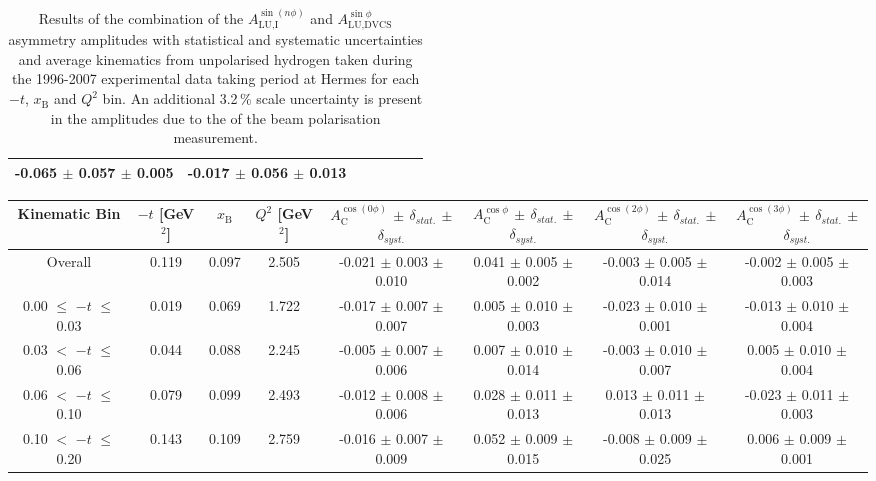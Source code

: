 \begin{table}[width=15cm]
\begin{center}
{\begin{tabular}{|c|c|c|c|c|c|c|}
-0.065  $\pm$  0.057 $\pm$ 0.005 & -0.017  $\pm$  0.056  $\pm$  0.013\\
\hline
  \end{tabular}
}
 \end{center}
\caption{Results of the combination of the $A_{\textrm{LU,I}}^{\sin(n\phi)}$ and $A_{\textrm{LU,DVCS}}^{\sin \phi}$ asymmetry amplitudes with statistical and systematic uncertainties and average kinematics from unpolarised hydrogen taken during
the 1996-2007 experimental data taking period at H{\sc ermes} for each $-t$, $x_{\textrm{B}}$ and $Q^{2}$ bin.
An additional 3.2\,\% scale uncertainty is present in the amplitudes due to the  of
the beam polarisation measurement.
}
\end{table}


\begin{table}[width=15cm]
 \begin{center}
\resizebox{16cm}{!} {
  \begin{tabular}{|c|c|c|c|c|c|c|c|}
\hline
Kinematic Bin &  $-t$ [GeV$^{2}$] & $x_{\textrm{B}}$ & $Q^{2}$ [GeV$^{2}$] & 
$A_{\textrm{C}}^{\cos(0\phi)}$ $\pm$ $\delta_{stat.}$ $\pm$ $\delta_{syst.}$ & $A_{\textrm{C}}^{\cos\phi}$ $\pm$ $\delta_{stat.}$ $\pm$ $\delta_{syst.}$
& $A_{\textrm{C}}^{\cos(2\phi)}$ $\pm$ $\delta_{stat.}$ $\pm$ $\delta_{syst.}$ & $A_{\textrm{C}}^{\cos(3\phi)}$ $\pm$ $\delta_{stat.}$ $\pm$ $\delta_{syst.}$ \\
\hline
\hline
Overall &  0.119 & 0.097 &  2.505 &  -0.021 $\pm$  0.003 $\pm$  0.010 & 
0.041  $\pm$  0.005 $\pm$   0.002 &  -0.003  $\pm$  0.005  $\pm$   0.014 &  -0.002  $\pm$   0.005   $\pm$   0.003 \\
\hline
0.00 $\leqslant$ $-t$ $\leqslant$ 0.03 &  0.019 & 0.069 & 1.722  &  -0.017  $\pm$  0.007 $\pm$ 0.007 & 
0.005  $\pm$  0.010  $\pm$   0.003 &  -0.023  $\pm$  0.010 $\pm$  0.001 &  -0.013   $\pm$  0.010   $\pm$   0.004\\
0.03 $<$ $-t$ $\leqslant$ 0.06 &  0.044 & 0.088 & 2.245 & -0.005  $\pm$  0.007  $\pm$   0.006 &
0.007 $\pm$  0.010  $\pm$   0.014 &  -0.003  $\pm$  0.010  $\pm$  0.007 &  0.005   $\pm$  0.010   $\pm$   0.004\\
0.06 $<$ $-t$ $\leqslant$ 0.10 & 0.079  & 0.099 &  2.493 & -0.012  $\pm$  0.008  $\pm$  0.006 & 
0.028 $\pm$  0.011  $\pm$   0.013 & 0.013  $\pm$  0.011 $\pm$   0.013 &  -0.023   $\pm$  0.011  $\pm$    0.003\\
0.10 $<$ $-t$ $\leqslant$ 0.20 & 0.143  & 0.109 &  2.759 &  -0.016  $\pm$  0.007   $\pm$  0.009 & 
0.052 $\pm$  0.009  $\pm$   0.015 &  -0.008  $\pm$  0.009  $\pm$  0.025 & 0.006   $\pm$  0.009    $\pm$  0.001\\

\end{tabular}}
\end{center}
\end{table}
